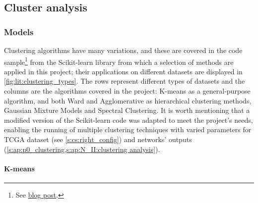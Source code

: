 \subsection{Cluster analysis} \label{s:lit:clustering}

\subsubsection*{Models} \label{s:lit:cs_models}

Clustering algorithms have many variations, and these are covered in the code sample\footnote{See \href{https://scikit-learn.org/stable/modules/clustering.html}{blog post}.} from the Scikit-learn library \citep{Pedregosa2011-ts} from which a selection of methods are applied in this project; their applications on different datasets are displayed in \cref{fig:lit:clustering_types}. The rows represent different types of datasets and the columns are the algorithms covered in the project: K-means as a general-purpose algorithm, and both Ward and Agglomerative as hierarchical clustering methods, Gaussian Mixture Models and Spectral Clustering. It is worth mentioning that a modified version of the Scikit-learn code was adapted to meet the project's needs, enabling the running of multiple clustering techniques with varied parameters for TCGA dataset (see \cref{s:cs:right_config}) and networks' outputs (\cref{s:ap:p0_clustering,s:ap:N_II:clustering analysis}).

\paragraph*{K-means}

